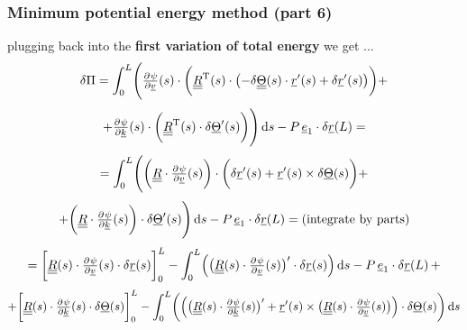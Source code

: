 \begin{frame}
  \frametitle{Minimum potential energy method (part 6)}
  
  plugging back into the \textbf{first variation of total energy} we get ...
  \begin{displaymath}
    \delta \Pi =
    \int_0^L \Biggl(
    \pd{\psi}{\underline{v}}(s) \cdot
    \biggl(
    \doubleunderline{R}^{\mathrm{T}}(s) \cdot
    \bigl( - \delta \doubleunderline{\Theta}(s) \cdot \underline{r}^{\prime}(s) + \delta \underline{r}^{\prime}(s) \bigr)
    \biggr) +
  \end{displaymath}
  \begin{displaymath}
    + \pd{\psi}{\underline{k}}(s) \cdot 
    \biggl(
    \doubleunderline{R}^{\mathrm{T}}(s) \cdot \delta \underline{\Theta}^{\prime}(s)
    \biggr)
    \Biggr) \dif s
    - P \, \underline{e}_1 \cdot \delta \underline{r}(L) =
  \end{displaymath}
  \begin{displaymath}
    = \int_0^L \Biggl(
    \biggl( \doubleunderline{R} \cdot \pd{\psi}{\underline{v}}(s) \biggr) \cdot
    \biggl(
      \delta \underline{r}^{\prime}(s) +
      \underline{r}^{\prime}(s) \times \delta \underline{\Theta}(s)
    \biggr) +
  \end{displaymath}
  \begin{displaymath}
    + \biggl( \doubleunderline{R} \cdot \pd{\psi}{\underline{k}}(s) \biggr) \cdot
    \delta \underline{\Theta}^{\prime}(s)
    \Biggr) \dif s
    - P \, \underline{e}_1 \cdot \delta \underline{r}(L) = (\text{integrate by parts})
  \end{displaymath}
  \begin{displaymath}
    = \biggl[ \doubleunderline{R}(s) \cdot \pd{\psi}{\underline{v}}(s) \cdot \delta \underline{r}(s) \biggr]_0^L -
    \int_0^L \Bigl(
      \bigl( \doubleunderline{R}(s) \cdot \pd{\psi}{\underline{v}}(s) \bigr)^{\prime} \cdot \delta \underline{r}(s)
    \Bigr) \dif s -P \, \underline{e}_1 \cdot \delta \underline{r}(L) \, +
  \end{displaymath}
  \begin{displaymath}
    + \biggl[ \doubleunderline{R}(s) \cdot \pd{\psi}{\underline{k}}(s) \cdot \delta \underline{\Theta}(s) \biggr]_0^L -
    \int_0^L \biggl(
      \Bigl(
        \bigl( \doubleunderline{R}(s) \cdot \pd{\psi}{\underline{k}}(s) \bigr)^{\prime} +
        \underline{r}^{\prime}(s) \times \bigl( \doubleunderline{R}(s) \cdot \pd{\psi}{\underline{v}}(s)  \bigr)
      \Bigr) \cdot \delta \underline{\Theta}(s)
    \biggr) \dif s
  \end{displaymath}
\end{frame}



